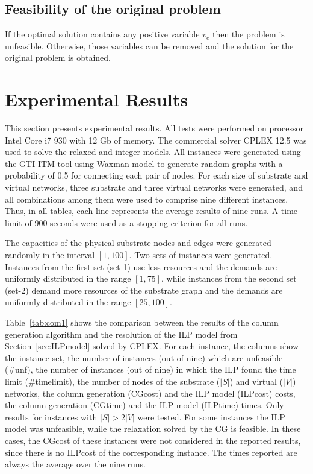 \documentclass{llncs}
\begin{document}
\subsection{Feasibility of the original problem}
If the optimal solution contains any positive variable $v_{e}$ then the problem is unfeasible.
Otherwise, those variables can be removed and the solution for the original problem is obtained.

\section{Experimental Results}
\label{sec:results}
This section presents experimental results. All tests were performed on processor Intel Core i7 930 with 12 Gb of memory. 
The commercial solver CPLEX 12.5 was used to solve the relaxed and integer models. 
All instances were generated using the GTI-ITM tool using Waxman model to generate random graphs with a probability of 0.5 for connecting each pair of nodes.
For each size of substrate and virtual networks, three substrate and three virtual networks were generated, and all combinations among them were used to comprise nine different instances. Thus, in all tables, each line represents the average results of nine runs. A time limit of 900 seconds were used as a stopping criterion for all runs.

The capacities of the physical substrate nodes and edges were generated randomly in the interval $[1,100]$.
Two sets of instances were generated. Instances from the first set (set-1) use less resources and the demands are uniformly distributed in the range $[1,75]$, while instances from the second set (set-2) demand more resources of the substrate graph and the demands are uniformly distributed in the range $[25,100]$.

Table~\ref{tab:com1} shows the comparison between the results of the column generation algorithm and the resolution of the ILP model from Section~\ref{sec:ILPmodel} solved by CPLEX.
For each instance, the columns show the instance set, the number of instances (out of nine) which are unfeasible (\#unf), the number of instances (out of nine) in which the ILP found the time limit (\#timelimit), the number of nodes of the substrate ($|S|$) and virtual ($|V|$) networks, the column generation (CGcost) and the ILP model (ILPcost) costs, the column generation (CGtime) and the ILP model (ILPtime) times. 
Only results for instances with $|S| > 2|V|$ were tested.
For some instances the ILP model was unfeasible, while the relaxation solved by the CG is feasible. 
In these cases, the CGcost of these instances were not considered in the reported results, since there is no ILPcost of the corresponding instance.
The times reported are always the average over the nine runs.
\end{document}
